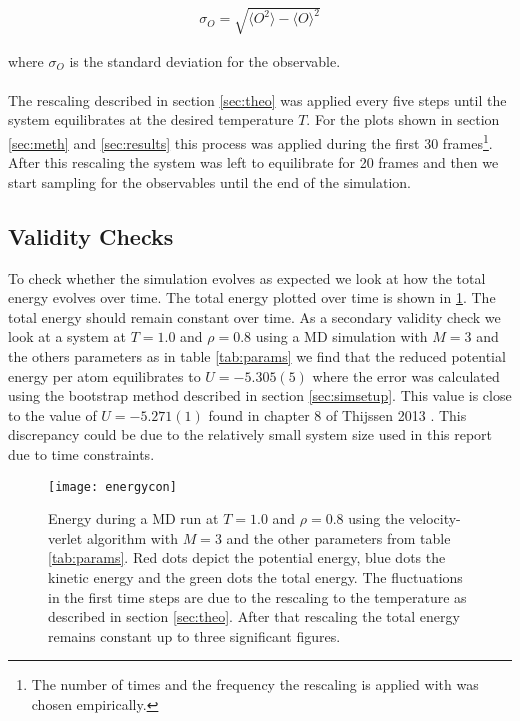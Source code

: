 \documentclass[10 pt, a4paper]{article}
\begin{document}
\begin{align*}
\sigma_O = \sqrt{\langle O ^2 \rangle - \langle O \rangle ^2}
\end{align*}

where $\sigma_O$ is the standard deviation for the observable.
\\
\\
The rescaling described in section \ref{sec:theo} was applied every five steps until the system equilibrates at the desired temperature $T$. For the plots shown in section \ref{sec:meth} and \ref{sec:results} this process was applied during the first 30 frames\footnote{The number of times and the frequency the rescaling is applied with was chosen empirically.}. After this rescaling the system was left to equilibrate for 20 frames and then we start sampling for the observables until the end of the simulation.

\subsection{Validity Checks}

To check whether the simulation evolves as expected we look at how the total energy evolves over time. The total energy plotted over time is shown in \ref{fig:energycon}. The total energy should remain constant over time. As a secondary validity check we look at a system at $T = 1.0$ and $\rho = 0.8$ using a MD simulation with $M = 3$ and the others parameters as in table \ref{tab:params} we find that the reduced potential energy per atom equilibrates to $U = -5.305(5)$ where the error was calculated using the bootstrap method described in section \ref{sec:simsetup}. This value is close to the value of $U = -5.271(1)$ found in chapter 8 of Thijssen 2013 \cite{thijssen}. This discrepancy could be due to the relatively small system size used in this report due to time constraints.

\begin{figure}[H]
\centering
\texttt{[image: energycon]}
\caption{Energy during a MD run at $T = 1.0$ and $\rho = 0.8$ using the velocity-verlet algorithm with $M = 3$ and the other parameters from table \ref{tab:params}. Red dots depict the potential energy, blue dots the kinetic energy and the green dots the total energy. The fluctuations in the first time steps are due to the rescaling to the temperature as described in section \ref{sec:theo}. After that rescaling the total energy remains constant up to three significant figures. }
\label{fig:energycon}
\end{figure}
\end{document}
